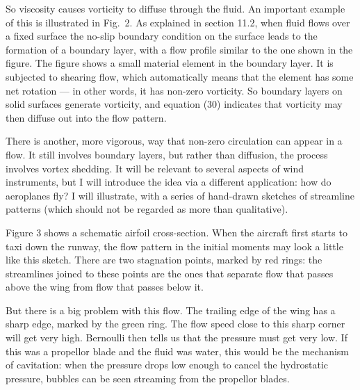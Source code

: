   So viscosity causes vorticity to diffuse through the fluid. An important 
  example of this is illustrated in Fig.\ 2. As explained in section 11.2, when 
  fluid flows over a fixed surface the no-slip boundary condition on the 
  surface leads to the formation of a boundary layer, with a flow profile 
  similar to the one shown in the figure. The figure shows a small material 
  element in the boundary layer. It is subjected to shearing flow, which 
  automatically means that the element has some net rotation --- in other 
  words, it has non-zero vorticity. So boundary layers on solid surfaces 
  generate vorticity, and equation (30) indicates that vorticity may then 
  diffuse out into the flow pattern. 


  There is another, more vigorous, way that non-zero circulation can appear in 
  a flow. It still involves boundary layers, but rather than diffusion, the 
  process involves vortex shedding. It will be relevant to several aspects of 
  wind instruments, but I will introduce the idea via a different application: 
  how do aeroplanes fly? I will illustrate, with a series of hand-drawn 
  sketches of streamline patterns (which should not be regarded as more than 
  qualitative). 

  Figure 3 shows a schematic airfoil cross-section. When the aircraft first 
  starts to taxi down the runway, the flow pattern in the initial moments may 
  look a little like this sketch. There are two stagnation points, marked by 
  red rings: the streamlines joined to these points are the ones that separate 
  flow that passes above the wing from flow that passes below it. 


  But there is a big problem with this flow. The trailing edge of the wing has 
  a sharp edge, marked by the green ring. The flow speed close to this sharp 
  corner will get very high. Bernoulli then tells us that the pressure must get 
  very low. If this was a propellor blade and the fluid was water, this would 
  be the mechanism of cavitation: when the pressure drops low enough to cancel 
  the hydrostatic pressure, bubbles can be seen streaming from the propellor 
  blades. 

